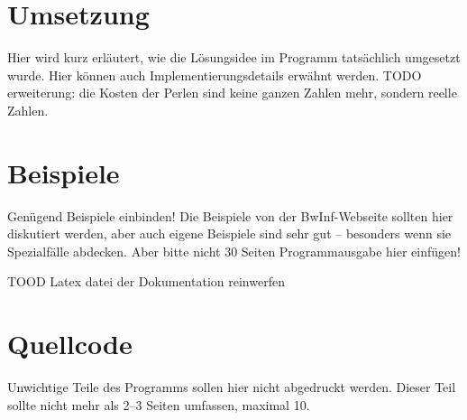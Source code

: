 \documentclass[a4paper,10pt,ngerman]{scrartcl}
\begin{document}
    \section{Umsetzung}
    Hier wird kurz erläutert, wie die Lösungsidee im Programm tatsächlich umgesetzt wurde. Hier können auch Implementierungsdetails erwähnt werden.
    TODO erweiterung: die Kosten der Perlen sind keine ganzen Zahlen mehr, sondern reelle Zahlen.


    \section{Beispiele}
    Genügend Beispiele einbinden! Die Beispiele von der BwInf-Webseite sollten hier diskutiert werden, aber auch eigene Beispiele sind sehr gut – besonders wenn sie Spezialfälle abdecken. Aber bitte nicht 30 Seiten Programmausgabe hier einfügen!

    TOOD Latex datei der Dokumentation reinwerfen


    \section{Quellcode}
    Unwichtige Teile des Programms sollen hier nicht abgedruckt werden. Dieser Teil sollte nicht mehr als 2–3 Seiten umfassen, maximal 10.
\end{document}
